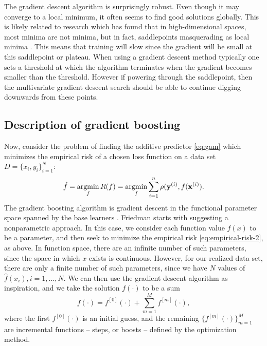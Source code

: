 The gradient descent algorithm is surprisingly robust. Even though it may converge to a local minimum, it often seems to find good solutions globally. This is likely related to research which has found that in high-dimensional spaces, most minima are not minima, but in fact, saddlepoints masquerading as local minima \citep{saddlepoints}. This means that training will slow since the gradient will be small at this saddlepoint or plateau. When using a gradient descent method typically one sets a threshold at which the algorithm terminates when the gradient becomes smaller than the threshold. However if powering through the saddlepoint, then the multivariate gradient descent search should be able to continue digging downwards from these points.

\subsection{Description of gradient boosting}
Now, consider the problem of finding the additive predictor \eqref{eq:gam} which minimizes the empirical risk of a chosen loss function on a data set $D=\{x_i,y_i\}_{i=1}^N$:
\begin{equation}
    \hat{f}=\operatorname*{argmin}_{f}R(f)=\operatorname*{argmin}_{f}\sum_{i=1}^n\rho(\mathbf{y}^{(i)},f(\mathbf{x}^{(i)}).
\end{equation}
The gradient boosting algorithm is gradient descent in the functional parameter space spanned by the base learners \citep{friedman2001}.
Friedman starts with suggesting a nonparametric approach. In this case, we consider each function value $f(x)$ to be a parameter, and then seek to minimize the empirical risk \eqref{eq:empirical-risk-2}, as above. In function space, there are an infinite number of such parameters, since the space in which $x$ exists is continuous. However, for our realized data set, there are only a finite number of such parameters, since we have $N$ values of $\hat{f}(x_i),i=1,\ldots,N$. We can then use the gradient descent algorithm as inspiration, and we take the solution $f(\cdot)$ to be a sum
\begin{equation}
    f(\cdot)=f^{[0]}(\cdot)+\sum_{m=1}^M f^{[m]}(\cdot),
\end{equation}
where the first $f^{[0]}(\cdot)$ is an initial guess, and the remaining $\{f^{[m]}(\cdot)\}_{m=1}^M$ are incremental functions -- steps, or boosts -- defined by the optimization method.

